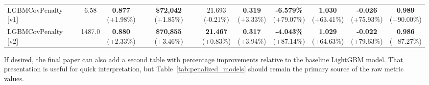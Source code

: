 \documentclass[12pt, draft]{article}
\theoremstyle{plain}
\theoremstyle{definition}
\newcommand{\1}{\mathbf{1}}
\begin{document}
\begin{table}[htbp]
{\begin{tabular}{lc|cc|cc|cccc}
    LGBMCovPenalty [v1] & 6.58 &
    \makecell{\textbf{0.877}\\{\scriptsize(\textcolor{green!60!black}{+1.98\%})}} &
    \makecell{\textbf{\$72,042}\\{\scriptsize(\textcolor{green!60!black}{+1.85\%})}} &
    \makecell{21.693\\{\scriptsize(\textcolor{red!70!black}{-0.21\%})}} &
    \makecell{\textbf{0.319}\\{\scriptsize(\textcolor{green!60!black}{+3.33\%})}} &
    \makecell{\textbf{-6.579\%}\\{\scriptsize(\textcolor{green!60!black}{+79.07\%})}} &
    \makecell{\textbf{1.030}\\{\scriptsize(\textcolor{green!60!black}{+63.41\%})}} &
    \makecell{\textbf{-0.026}\\{\scriptsize(\textcolor{green!60!black}{+75.93\%})}} &
    \makecell{\textbf{0.989}\\{\scriptsize(\textcolor{green!60!black}{+90.00\%})}} \\
    [1.5mm]

    LGBMCovPenalty [v2] & 1487.0 &
    \makecell{\textbf{0.880}\\{\scriptsize(\textcolor{green!60!black}{+2.33\%})}} &
    \makecell{\textbf{\$70,855}\\{\scriptsize(\textcolor{green!60!black}{+3.46\%})}} &
    \makecell{\textbf{21.467}\\{\scriptsize(\textcolor{green!60!black}{+0.83\%})}} &
    \makecell{\textbf{0.317}\\{\scriptsize(\textcolor{green!60!black}{+3.94\%})}} &
    \makecell{\textbf{-4.043\%}\\{\scriptsize(\textcolor{green!60!black}{+87.14\%})}} &
    \makecell{\textbf{1.029}\\{\scriptsize(\textcolor{green!60!black}{+64.63\%})}} &
    \makecell{\textbf{-0.022}\\{\scriptsize(\textcolor{green!60!black}{+79.63\%})}} &
    \makecell{\textbf{0.986}\\{\scriptsize(\textcolor{green!60!black}{+87.27\%})}} \\
    \bottomrule
    \end{tabular}
    }
\end{table}

If desired, the final paper can also add a second table with percentage improvements relative to the baseline LightGBM model. That presentation is useful for quick interpretation, but Table~\ref{tab:penalized_models} should remain the primary source of the raw metric values.
\end{document}
